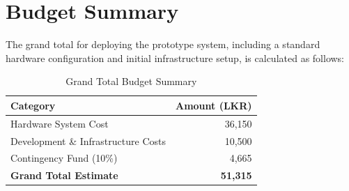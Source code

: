 \begin{table}[htbp]
    \centering
    \caption{Development and Infrastructure Costs}
    \label{tab:dev_cost}
\end{table}

\section{Budget Summary}

The grand total for deploying the prototype system, including a standard hardware configuration and initial infrastructure setup, is calculated as follows:

\begin{table}[htbp]
    \centering
    \caption{Grand Total Budget Summary}
    \label{tab:grand_total}
    \begin{tabular}{lr}
        \toprule
        \textbf{Category} & \textbf{Amount (LKR)} \\
        \midrule
        Hardware System Cost & 36,150 \\
        Development \& Infrastructure Costs & 10,500 \\
        \midrule
        Contingency Fund (10\%) & 4,665 \\
        \midrule
        \textbf{Grand Total Estimate} & \textbf{51,315} \\
        \bottomrule
    \end{tabular}
\end{table}

